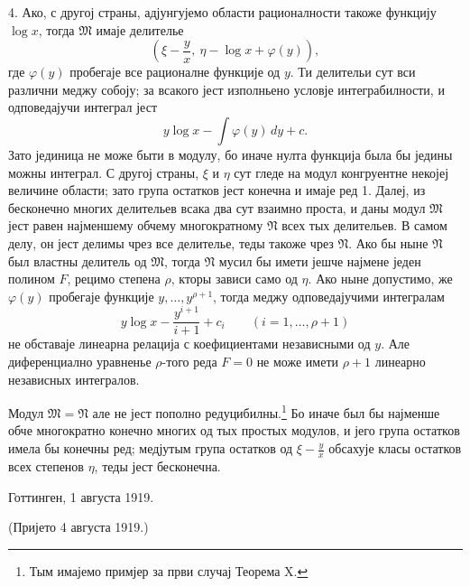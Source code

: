﻿\documentclass[11pt]{article}
\begin{document}
4. Ако, с другој страны, адјунгујемо области рационалности такоже функцију \(\log x\), тогда \(\mathfrak M\) имаје делителье
\[
 \left(\xi-\frac{y}{x},\ \eta-\log x+\varphi(y)\right),
\]
где \(\varphi(y)\) пробегаје все рационалне функције од \(y\). Ти делительи сут вси различни меджу собоју; за всакого јест изполньено условје интеграбилности, и одповедајучи интеграл јест
\[
 y\log x-\int\varphi(y)\,dy+c.
\]
Зато јединица не може быти в модулу, бо иначе нулта функција была бы једины можны интеграл. С другој страны, \(\xi\) и \(\eta\) сут гледе на модул конгруентне некојеј величине области; зато група остатков јест конечна и имаје ред 1. Далеј, из бесконечно многих делительев всака два сут взаимно проста, и даны модул \(\mathfrak M\) јест равен најменшему обчему многократному \(\mathfrak N\) всех тых делительев. В самом делу, он јест делимы чрез все делителье, теды такоже чрез \(\mathfrak N\). Ако бы ныне \(\mathfrak N\) был властны делитель од \(\mathfrak M\), тогда \(\mathfrak N\) мусил бы имети јешче најмене једен полином \(F\), рецимо степена \(\rho\), кторы зависи само од \(\eta\). Ако ныне допустимо, же \(\varphi(y)\) пробегаје функције \(y,
\ldots,y^{\rho+1}\), тогда меджу одповедајучими интегралам
\[
 y\log x-\frac{y^{i+1}}{i+1}+c_i\qquad(i=1,
\ldots,
\rho+1)
\]
не обставаје линеарна релација с коефициентами независными од \(y\). Але диференциално уравненье \(\rho\)-того реда \(F=0\) не може имети \(\rho+1\) линеарно независных интегралов.

Модул \(\mathfrak M=\mathfrak N\) але не јест пополно редуцибилны.\footnote{Тым имајемо примјер за први случај Теорема X.} Бо иначе был бы најменше обче многократно конечно многих од тых простых модулов, и јего група остатков имела бы конечны ред; медјутым група остатков од \(\xi-\frac{y}{x}\) обсахује класы остатков всех степенов \(\eta\), теды јест бесконечна.

Готтинген, 1 августа 1919.

\begin{center}
(Пријето 4 августа 1919.)
\end{center}
\end{document}
